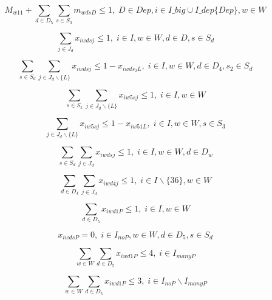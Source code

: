 \begin{equation}
M_{w11} + \sum_{d \in D_5}\sum_{s \in S_3} m_{wdsD} \leq 1, \;   D \in Dep, i \in I\_big \cup I\_dep\{Dep\}, w \in W
\end{equation}

\begin{equation}
\sum_{j \in J_d} x_{iwdsj} \leq 1, \;   i \in I, w \in W, d \in D, s \in S_d
\end{equation}

\begin{equation}
\sum_{s \in S_d}\sum_{j \in J_d\backslash \{L\}} x_{iwdsj} \leq 1 - x_{iwds_2L}, \;   i \in I, w \in W, d \in D_4, s_2 \in S_d
\end{equation}

\begin{equation}
\sum_{s \in S_5}\sum_{j \in J_d\backslash \{L\}} x_{iw5sj} \leq 1, \;   i \in I, w \in W
\end{equation}

\begin{equation}
\sum_{j \in J_d\backslash \{L\}} x_{iw5sj} \leq 1 - x_{iw51L}, \;   i \in I, w \in W, s \in S_3
\end{equation}

\begin{equation}
\sum_{s \in S_d}\sum_{j \in J_d} x_{iwdsj} \leq 1, \;   i \in I, w \in W, d \in D_w
\end{equation}

\begin{equation}
\sum_{d \in D_4}\sum_{j \in J_d} x_{iwd4j} \leq 1, \;   i \in I \backslash \{36\}, w \in W
\end{equation}

\begin{equation}
\sum_{d \in D_5} x_{iwd1P} \leq 1, \; i \in I, w \in W
\end{equation}

\begin{equation}
x_{iwdsP} = 0, \; i \in I_{noP}, w \in W, d \in D_5, s \in S_d
\end{equation}

\begin{equation}
\sum_{w \in W} \sum_{d \in D_5} x_{iwd1P} \leq 4, \; i \in I_{manyP}
\end{equation}

\begin{equation}
\sum_{w \in W} \sum_{d \in D_5} x_{iwd1P} \leq 3, \; i \in I_{noP} \backslash I_{manyP}
\end{equation}	


